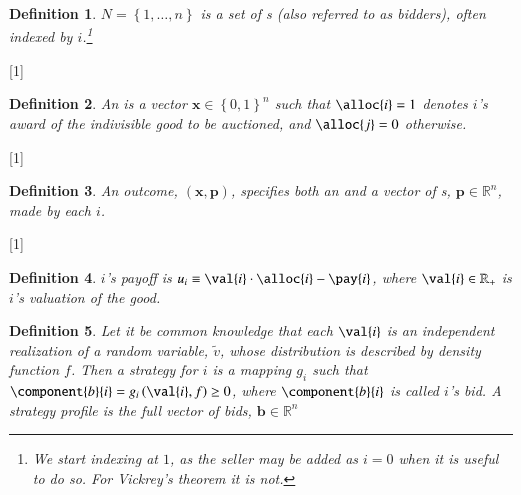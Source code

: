 \documentclass[12pt,a4paper]{scrartcl}
\newtheorem{definition}{Definition}
\theoremstyle{remark} %
\begin{document}
\begin{module}[id=single-good-auction]
  \begin{definition}
    $N = \left\{ 1, \ldots, n \right\}$ is a set of \emph{{\participant}s} (also referred to as \emph{bidders}), often indexed by $i$.\footnote{We start indexing at $1$, as the seller may be added as $i=0$ when it is useful to do so.  For Vickrey's theorem it is not.}
  \end{definition}

  [1]{} %
  \begin{definition}
    An \emph{\allocation} is a vector $\bm{x} \in \left\{ 0, 1 \right\}^n$ such that $\alloc{i} = 1$ denotes \participant $i$'s award of the indivisible good to be auctioned, and $\alloc{j} = 0$ otherwise.
  \end{definition}

  [1]{} %
  \begin{definition}
    An \emph{outcome}, $\left( \bm{x}, \bm{p} \right)$, specifies both an \allocation and a vector of {\payment}s, $\bm{p} \in \mathbb{R}^n$, made by each \participant $i$.
  \end{definition}

  [1]{} %
  \begin{definition}
    \capitalize\participant $i$'s \emph{payoff} is $u_i \equiv \val{i} \cdot \alloc{i} - \pay{i}$, where $\val{i} \in \mathbb{R}_+$ is \participant $i$'s valuation of the good.
  \end{definition}

  \begin{definition}\label{def:strategy}
    Let it be common knowledge that each $\val{i}$ is an independent realization of a random variable, $\tilde{v}$, whose distribution is described by density function $f$.  Then a \emph{strategy} for \bidder $i$ is a mapping $g_i$ such that $\component{b}{i} = g_i \left( \val{i}, f \right) \ge 0$, where $\component{b}{i}$ is called $i$'s \emph{bid}.  A \emph{strategy profile} is the full vector of bids, $\bm{b} \in \mathbb{R}^n$
  \end{definition}
\end{module}
\end{document}
